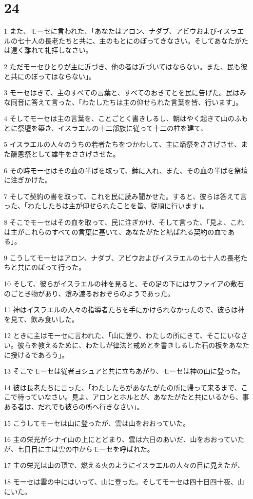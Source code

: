 \chapter{24}

\par 1 また、モーセに言われた、「あなたはアロン、ナダブ、アビウおよびイスラエルの七十人の長老たちと共に、主のもとにのぼってきなさい。そしてあなたがたは遠く離れて礼拝しなさい。
\par 2 ただモーセひとりが主に近づき、他の者は近づいてはならない。また、民も彼と共にのぼってはならない」。
\par 3 モーセはきて、主のすべての言葉と、すべてのおきてとを民に告げた。民はみな同音に答えて言った、「わたしたちは主の仰せられた言葉を皆、行います」。
\par 4 そしてモーセは主の言葉を、ことごとく書きしるし、朝はやく起きて山のふもとに祭壇を築き、イスラエルの十二部族に従って十二の柱を建て、
\par 5 イスラエルの人々のうちの若者たちをつかわして、主に燔祭をささげさせ、また酬恩祭として雄牛をささげさせた。
\par 6 その時モーセはその血の半ばを取って、鉢に入れ、また、その血の半ばを祭壇に注ぎかけた。
\par 7 そして契約の書を取って、これを民に読み聞かせた。すると、彼らは答えて言った、「わたしたちは主が仰せられたことを皆、従順に行います」。
\par 8 そこでモーセはその血を取って、民に注ぎかけ、そして言った、「見よ、これは主がこれらのすべての言葉に基いて、あなたがたと結ばれる契約の血である」。
\par 9 こうしてモーセはアロン、ナダブ、アビウおよびイスラエルの七十人の長老たちと共にのぼって行った。
\par 10 そして、彼らがイスラエルの神を見ると、その足の下にはサファイアの敷石のごとき物があり、澄み渡るおおぞらのようであった。
\par 11 神はイスラエルの人々の指導者たちを手にかけられなかったので、彼らは神を見て、飲み食いした。
\par 12 ときに主はモーセに言われた、「山に登り、わたしの所にきて、そこにいなさい。彼らを教えるために、わたしが律法と戒めとを書きしるした石の板をあなたに授けるであろう」。
\par 13 そこでモーセは従者ヨシュアと共に立ちあがり、モーセは神の山に登った。
\par 14 彼は長老たちに言った、「わたしたちがあなたがたの所に帰って来るまで、ここで待っていなさい。見よ、アロンとホルとが、あなたがたと共にいるから、事ある者は、だれでも彼らの所へ行きなさい」。
\par 15 こうしてモーセは山に登ったが、雲は山をおおっていた。
\par 16 主の栄光がシナイ山の上にとどまり、雲は六日のあいだ、山をおおっていたが、七日目に主は雲の中からモーセを呼ばれた。
\par 17 主の栄光は山の頂で、燃える火のようにイスラエルの人々の目に見えたが、
\par 18 モーセは雲の中にはいって、山に登った。そしてモーセは四十日四十夜、山にいた。

